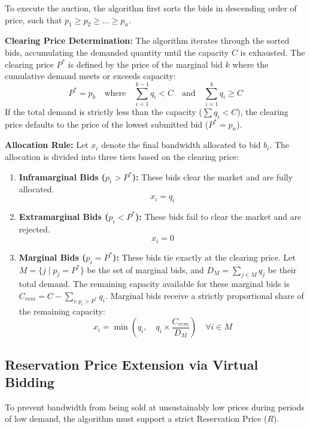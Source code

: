 To execute the auction, the algorithm first sorts the bids in descending order of price, such that $p_1 \ge p_2 \ge \dots \ge p_n$. 

\textbf{Clearing Price Determination:}
The algorithm iterates through the sorted bids, accumulating the demanded quantity until the capacity $C$ is exhausted. The clearing price $P^*$ is defined by the price of the marginal bid $k$ where the cumulative demand meets or exceeds capacity:
\begin{equation}
    P^* = p_k \quad \text{where} \quad \sum_{i=1}^{k-1} q_i < C \quad \text{and} \quad \sum_{i=1}^{k} q_i \ge C
\end{equation}
If the total demand is strictly less than the capacity ($\sum q_i < C$), the clearing price defaults to the price of the lowest submitted bid ($P^* = p_n$).

\textbf{Allocation Rule:}
Let $x_i$ denote the final bandwidth allocated to bid $b_i$. The allocation is divided into three tiers based on the clearing price:
\begin{enumerate}
    \item \textbf{Inframarginal Bids ($p_i > P^*$):} These bids clear the market and are fully allocated. 
    \begin{equation}
        x_i = q_i
    \end{equation}
    \item \textbf{Extramarginal Bids ($p_i < P^*$):} These bids fail to clear the market and are rejected. 
    \begin{equation}
        x_i = 0
    \end{equation}
    \item \textbf{Marginal Bids ($p_i = P^*$):} These bids tie exactly at the clearing price. Let $M = \{j \mid p_j = P^*\}$ be the set of marginal bids, and $D_M = \sum_{j \in M} q_j$ be their total demand. The remaining capacity available for these marginal bids is $C_{rem} = C - \sum_{i : p_i > P^*} q_i$. Marginal bids receive a strictly proportional share of the remaining capacity:
    \begin{equation}
        x_i = \min \left( q_i, \quad q_i \times \frac{C_{rem}}{D_M} \right) \quad \forall i \in M
    \end{equation}
\end{enumerate}

\subsection{Reservation Price Extension via Virtual Bidding}
To prevent bandwidth from being sold at unsustainably low prices during periods of low demand, the algorithm must support a strict Reservation Price ($R$).

